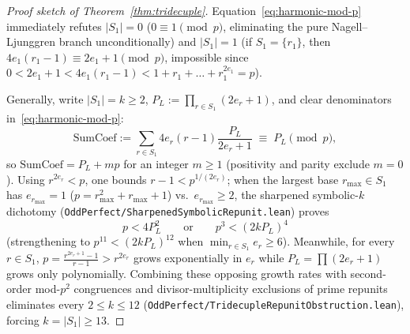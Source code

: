 \documentclass[11pt]{amsart}
\theoremstyle{definition}
\theoremstyle{remark}
\begin{document}
\begin{proof}[Proof sketch of Theorem~\ref{thm:tridecuple}]
Equation~\eqref{eq:harmonic-mod-p} immediately refutes $|S_1| = 0$ ($0 \equiv 1 \pmod p$, eliminating the pure Nagell--Ljunggren branch unconditionally) and $|S_1| = 1$ (if $S_1 = \{r_1\}$, then $4 e_1(r_1 - 1) \equiv 2 e_1 + 1 \pmod p$, impossible since $0 < 2 e_1 + 1 < 4 e_1(r_1 - 1) < 1 + r_1 + \dots + r_1^{2 e_1} = p$).

Generally, write $|S_1| = k \ge 2$, $P_L := \prod_{r \in S_1} (2 e_r + 1)$, and clear denominators in~\eqref{eq:harmonic-mod-p}:
\[
  \mathrm{SumCoef} := \sum_{r \in S_1} 4 e_r (r - 1) \frac{P_L}{2 e_r + 1} \;\equiv\; P_L \pmod p,
\]
so $\mathrm{SumCoef} = P_L + m p$ for an integer $m \ge 1$ (positivity and parity exclude $m = 0$). Using $r^{2 e_r} < p$, one bounds $r - 1 < p^{1/(2 e_r)}$; when the largest base $r_{\max} \in S_1$ has $e_{r_{\max}} = 1$ ($p = r_{\max}^2 + r_{\max} + 1$) vs.\ $e_{r_{\max}} \ge 2$, the sharpened symbolic-$k$ dichotomy (\texttt{OddPerfect/SharpenedSymbolicRepunit.lean}) proves
\[
  p < 4 P_L^2 \qquad \text{or} \qquad p^3 < (2 k P_L)^4
\]
(strengthening to $p^{11} < (2 k P_L)^{12}$ when $\min_{r \in S_1} e_r \ge 6$). Meanwhile, for every $r \in S_1$, $p = \frac{r^{2 e_r + 1} - 1}{r - 1} > r^{2 e_r}$ grows exponentially in $e_r$ while $P_L = \prod (2 e_r + 1)$ grows only polynomially. Combining these opposing growth rates with second-order mod-$p^2$ congruences and divisor-multiplicity exclusions of prime repunits eliminates every $2 \le k \le 12$ (\texttt{OddPerfect/TridecupleRepunitObstruction.lean}), forcing $k = |S_1| \ge 13$.


\end{proof}
\end{document}
